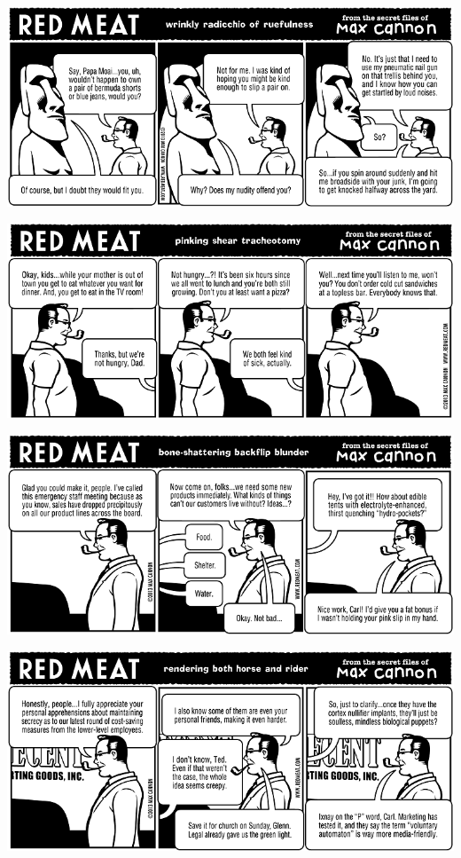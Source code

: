 \documentclass[a4paper,twoside,11pt]{article}
\begin{document}
\includegraphics[width=\textwidth]{redmeat_2013-10-15.png}



\includegraphics[width=\textwidth]{redmeat_2013-10-22.png}



\includegraphics[width=\textwidth]{redmeat_2013-10-29.png}



\includegraphics[width=\textwidth]{redmeat_2013-11-05.png}
\end{document}
